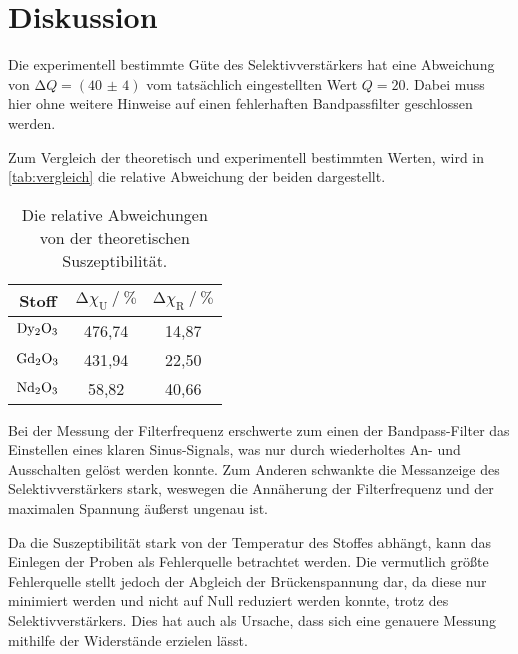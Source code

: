 \section{Diskussion}
\label{sec:Diskussion}

Die experimentell bestimmte Güte des Selektivverstärkers hat eine Abweichung von $\increment Q = (\num{40(4)})$ vom tatsächlich eingestellten Wert $Q = 20$.
Dabei muss hier ohne weitere Hinweise auf einen fehlerhaften Bandpassfilter geschlossen werden.

Zum Vergleich der theoretisch und experimentell bestimmten Werten, 
wird in \autoref{tab:vergleich} die relative Abweichung der beiden dargestellt.
\begin{table}
    \centering
    \caption{Die relative Abweichungen von der theoretischen Suszeptibilität.}
    \label{tab:vergleich}
    \begin{tabular}{c c c}
        \toprule
        Stoff &  
        $\increment \chi_\text{U} \mathbin{/} \%$ & 
        $\increment \chi_\text{R} \mathbin{/} \%$ \\
        \midrule
        $\ce{Dy2O3}$ &   476,74 &    14,87 \\
        $\ce{Gd2O3}$ &   431,94 &    22,50 \\
        $\ce{Nd2O3}$ &    58,82 &    40,66 \\
        \bottomrule
    \end{tabular}
\end{table}

Bei der Messung der Filterfrequenz erschwerte zum einen der Bandpass-Filter das Einstellen eines klaren Sinus-Signals, 
was nur durch wiederholtes An- und Ausschalten gelöst werden konnte.
Zum Anderen schwankte die Messanzeige des Selektivverstärkers stark, 
weswegen die Annäherung der Filterfrequenz und der maximalen Spannung äußerst ungenau ist.

Da die Suszeptibilität stark von der Temperatur des Stoffes abhängt, kann das Einlegen der Proben als Fehlerquelle betrachtet werden.
Die vermutlich größte Fehlerquelle stellt jedoch der Abgleich der Brückenspannung dar, 
da diese nur minimiert werden und nicht auf Null reduziert werden konnte, trotz des Selektivverstärkers. 
Dies hat auch als Ursache, dass sich eine genauere Messung mithilfe der Widerstände erzielen lässt.
